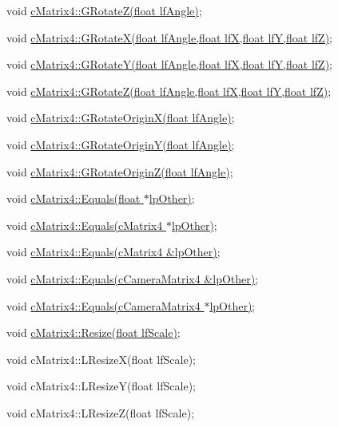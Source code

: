  void \hyperlink{classc_matrix4_a1d082ca0f1c634d262309eb75a9e2df5}{cMatrix4::GRotateZ(float lfAngle)}; \par
 \par
 void \hyperlink{classc_matrix4_a517140950c736c74a44d34704b44c83d}{cMatrix4::GRotateX(float lfAngle,float lfX,float lfY,float lfZ)}; \par
 void \hyperlink{classc_matrix4_a5b1505c43d9382bc625fc1eb53d44360}{cMatrix4::GRotateY(float lfAngle,float lfX,float lfY,float lfZ)}; \par
 void \hyperlink{classc_matrix4_a5b357f5686b74e0feeff7eaae070f566}{cMatrix4::GRotateZ(float lfAngle,float lfX,float lfY,float lfZ)}; \par
 \par
 void \hyperlink{classc_matrix4_a3ddcb503ea46911e194a9b881a6f0bee}{cMatrix4::GRotateOriginX(float lfAngle)}; \par
 void \hyperlink{classc_matrix4_abe68a204b91201b33adc32f5b354631e}{cMatrix4::GRotateOriginY(float lfAngle)}; \par
 void \hyperlink{classc_matrix4_af5ecfcfab719acf23ddb1148ad24825a}{cMatrix4::GRotateOriginZ(float lfAngle)}; \par
 \par
 void \hyperlink{classc_matrix4_adb76264fa82ef10ebb24b64d6293bc9d}{cMatrix4::Equals(float $\ast$lpOther)}; \par
 void \hyperlink{classc_matrix4_a943edd1e04048bd2bcb93987a6c47819}{cMatrix4::Equals(cMatrix4 $\ast$lpOther)}; \par
 void \hyperlink{classc_matrix4_a2b04c467006fe476d6f2e5efc61b3ead}{cMatrix4::Equals(cMatrix4 \&lpOther)}; \par
 void \hyperlink{classc_matrix4_a0af5e0b1dbbe6d7f4c512a5f07f1e273}{cMatrix4::Equals(cCameraMatrix4 \&lpOther)}; \par
 void \hyperlink{classc_matrix4_a12b028ad76a776c5a01d695ea620962b}{cMatrix4::Equals(cCameraMatrix4 $\ast$lpOther)}; \par
 \par
 void \hyperlink{classc_matrix4_a4785b8464f65d9784db634f3a6f34e52}{cMatrix4::Resize(float lfScale)}; \par
 \par
 void cMatrix4::LResizeX(float lfScale); \par
 void cMatrix4::LResizeY(float lfScale); \par
 void cMatrix4::LResizeZ(float lfScale); \par
 \par

